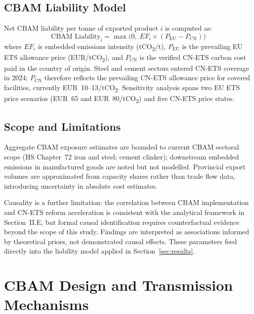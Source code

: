 \documentclass[letterpaper, 10pt, conference]{ieeeconf}
\begin{document}
\subsection{CBAM Liability Model}
\label{sec:model}

Net CBAM liability per tonne of exported product $i$ is computed as:
%
\begin{equation}
  \text{CBAM Liability}_i =
    \max\!\bigl(0,\; EF_i \times (P_{\mathrm{EU}} - P_{\mathrm{CN}})\bigr)
  \label{eq:cbam_method}
\end{equation}
%
where $EF_i$ is embedded emissions intensity (tCO\textsubscript{2}/t),
$P_{\mathrm{EU}}$ is the prevailing EU ETS allowance price
(EUR/tCO\textsubscript{2}), and $P_{\mathrm{CN}}$ is the verified
CN-ETS carbon cost paid in the country of origin. Steel and cement
sectors entered CN-ETS coverage in 2024; $P_{\mathrm{CN}}$ therefore
reflects the prevailing CN-ETS allowance price for covered facilities,
currently EUR~10--13/tCO\textsubscript{2}. Sensitivity analysis spans
two EU ETS price scenarios (EUR~65 and EUR~80/tCO\textsubscript{2})
and five CN-ETS price states.

\subsection{Scope and Limitations}

Aggregate CBAM exposure estimates are bounded to current CBAM sectoral scope (HS Chapter~72
iron and steel; cement clinker); downstream embedded emissions in
manufactured goods are noted but not modelled. Provincial export
volumes are approximated from capacity shares rather than trade flow
data, introducing uncertainty in absolute cost estimates.

Causality is a further limitation: the correlation between CBAM
implementation and CN-ETS reform acceleration is consistent with the
analytical framework in Section~II.E, but formal causal identification
requires counterfactual evidence beyond the scope of this study.
Findings are interpreted as associations informed by theoretical
priors, not demonstrated causal effects. These parameters feed
directly into the liability model applied in Section~\ref{sec:results}.

\section{CBAM Design and Transmission Mechanisms}
\end{document}
